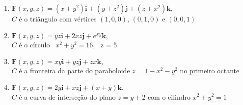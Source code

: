 \documentclass[a4paper, 12pt]{article}
\begin{document}
	\begin{enumerate}[resume]
	
		\item $\textbf{F}(x,y,z) =  (x + y^2)\textbf{i} + (y + z^2)\textbf{j} + (z + x^2)\textbf{k}$, \\ $C$ é o triângulo com vértices $(1,0,0)$, $(0,1,0)$ e $(0,0,1)$

		\item $\textbf{F}(x,y,z) =  yz\textbf{i} + 2xz\textbf{j} + e^{xy}\textbf{k}$, \\ $C$ é o círculo \, $x^2 + y^2 = 16$, \, z = 5
		\resposta{$80\pi$}

		\item $\textbf{F}(x,y,z) =  xy\textbf{i} + yz\textbf{j} + zx\textbf{k}$, \\ $C$ é a fronteira da parte do paraboloide $z = 1 - x^2 - y^2$ no primeiro octante

		\item $\textbf{F}(x,y,z) =  2y\textbf{i} + xz\textbf{j} + (x + y)\textbf{k}$, \\ $C$ é a curva de interseção do plano $z = y + 2$ com o cilindro $x^2 + y^2 = 1$
		\resposta{$\pi$}
	
	\end{enumerate}
		
	\vspace{5mm}	
	
\end{document}
